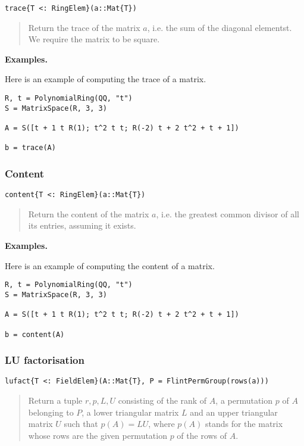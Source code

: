 \documentclass[a4paper,10pt]{article}
\newcommand{\desc}[1]{\vspace{-3mm}\begin{quote}#1\end{quote}}
\begin{document}
\begin{lstlisting}
trace{T <: RingElem}(a::Mat{T})
\end{lstlisting}

\desc{Return the trace of the matrix $a$, i.e. the sum of the diagonal
elementst. We require the matrix to be square.}

\textbf{Examples.}

Here is an example of computing the trace of a matrix.

\begin{lstlisting}
R, t = PolynomialRing(QQ, "t")
S = MatrixSpace(R, 3, 3)

A = S([t + 1 t R(1); t^2 t t; R(-2) t + 2 t^2 + t + 1])

b = trace(A)
\end{lstlisting}

\subsubsection{Content}

\begin{lstlisting}
content{T <: RingElem}(a::Mat{T})
\end{lstlisting}

\desc{Return the content of the matrix $a$, i.e. the greatest common
divisor of all its entries, assuming it exists.}

\textbf{Examples.}

Here is an example of computing the content of a matrix.

\begin{lstlisting}
R, t = PolynomialRing(QQ, "t")
S = MatrixSpace(R, 3, 3)

A = S([t + 1 t R(1); t^2 t t; R(-2) t + 2 t^2 + t + 1])

b = content(A)
\end{lstlisting}

\subsubsection{LU factorisation}

\begin{lstlisting}
lufact{T <: FieldElem}(A::Mat{T}, P = FlintPermGroup(rows(a)))
\end{lstlisting}

\desc{Return a tuple $r, p, L, U$ consisting of the rank of $A$, a permutation
$p$ of $A$ belonging to $P$, a lower triangular matrix $L$ and an upper
triangular matrix $U$ such that $p(A) = LU$, where $p(A)$ stands for the
matrix whose rows are the given permutation $p$ of the rows of $A$.}
\end{document}
